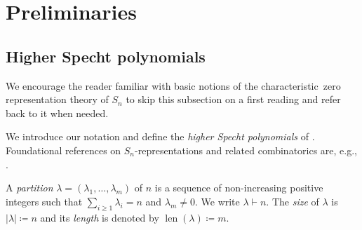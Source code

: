 \documentclass[11pt]{amsart}
\theoremstyle{definition}
\newcommand{\CC}{\mathbb{C}}
\DeclareMathOperator{\len}{len}
\begin{document}


\section{Preliminaries}\label{section:preliminaries}

\subsection{Higher Specht polynomials}
We encourage the reader familiar with basic notions of the characteristic~zero representation theory of $S_n$ to skip this subsection on a first reading and refer back to it when needed.

We introduce our notation and define the \emph{higher Specht polynomials} of \cite{Terasoma1993Higher}. Foundational references on $S_n$-representations and related combinatorics are, e.g., \cite{FultonHarris1991ReprTheory,Fulton,Sagan}.

A \emph{partition} $\lambda=(\lambda_1,\ldots,\lambda_m)$ of $n$ is a sequence of non-increasing positive integers such that $\sum_{i\geq1} \lambda_i = n$ and $\lambda_m \neq 0$.
We write $\lambda \vdash n$.
The \emph{size} of $\lambda$ is $|\lambda| \coloneqq n$ and its \emph{length} is denoted by $\len(\lambda) \coloneqq m$. 
\end{document}
